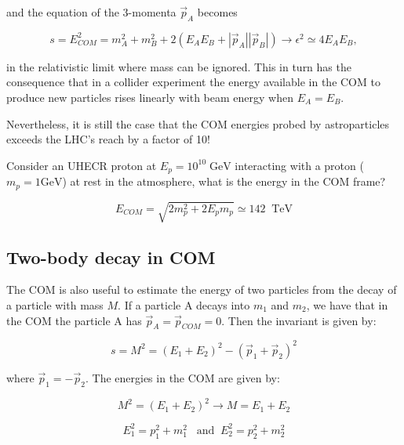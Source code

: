 \documentclass[
  letterpaper,
  DIV=11,
  numbers=noendperiod]{scrreprt}
\begin{document}
and the equation of the 3-momenta \({\vec p}_A\) becomes

\[
s = E_{COM}^2 = m_A^2 + m_B^2 + 2(E_AE_B + |{\vec p}_{A}||{\vec p}_{B}|) \rightarrow \epsilon^2 \simeq 4E_AE_B,
\]

in the relativistic limit where mass can be ignored. This in turn has
the consequence that in a collider experiment the energy available in
the COM to produce new particles rises linearly with beam energy when
\(E_A = E_B\).

Nevertheless, it is still the case that the COM energies probed by
astroparticles exceeds the LHC's reach by a factor of 10!

\begin{tcolorbox}[enhanced jigsaw, colframe=quarto-callout-tip-color-frame, leftrule=.75mm, left=2mm, opacitybacktitle=0.6, colbacktitle=quarto-callout-tip-color!10!white, coltitle=black, arc=.35mm, titlerule=0mm, toprule=.15mm, opacityback=0, bottomrule=.15mm, breakable, bottomtitle=1mm, rightrule=.15mm, toptitle=1mm, colback=white, title=\textcolor{quarto-callout-tip-color}{\faLightbulb}\hspace{0.5em}{Example 2: UHECR protons}]

Consider an UHECR proton at \(E_p = 10^{10}\;\mathrm{ GeV}\) interacting
with a proton (\(m_p = 1 \mathrm{ GeV}\)) at rest in the atmosphere,
what is the energy in the COM frame?

\[E_{COM} = \sqrt{2 m_p^2 + 2 E_p m_p} \simeq 142\;\; \mathrm{ TeV} \]

\end{tcolorbox}

\subsection{Two-body decay in COM}\label{two-body-decay-in-com}

The COM is also useful to estimate the energy of two particles from the
decay of a particle with mass \(M\). If a particle A decays into \(m_1\)
and \(m_2\), we have that in the COM the particle A has
\({\vec p_A} = {\vec p_{COM}} = 0\). Then the invariant is given by:

\[ s = M^2 = (E_1 + E_2)^2 -  (\vec{p}_1 + \vec{p}_2)^2 \]

where \({\vec p_1} = -{\vec p_2}\). The energies in the COM are given
by:

\[ M^2 = (E_1 + E_2)^2 \rightarrow M = E_1 + E_2 \]

\[E_1^2 = p_1^2 + m_1^2\;\;\;\mathrm{ and}\;\; E_2^2 = p_2^2 + m_2^2\]
\end{document}
